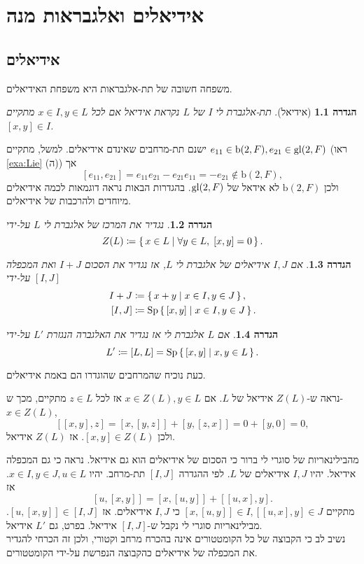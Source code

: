 \documentclass{report}
\theoremstyle{break}
\newtheorem{definition}[definition]{הגדרה}
\theoremstyle{MyNonumberbreak}
\DeclareMathOperator{\Sp}{Sp}
\begin{document}
\chapter{אידיאלים ואלגבראות מנה}
\section{אידיאלים}
משפחה חשובה של תת-אלגבראות היא משפחת האידיאלים. 
\begin{definition}[אידיאל]
	תת-אלגברת לי $I$ של $L$ נקראת \textit{אידיאל} אם לכל $x \in I, y \in L$ מתקיים $[x, y] \in I$.
\end{definition}
ישנם תת-מרחבים שאינדם אידיאלים. למשל, מתקיים $e_{11} \in \mathrm{b}(2, F), e_{21} \in \operatorname{gl}(2, F)$ (ראו \autoref*{exa:Lie} (ה)) אך
\[ [e_{11}, e_{21}] = e_{11}e_{21} - e_{21}e_{11} = -e_{21} \notin \mathrm{b}(2, F), \]
ולכן $\mathrm{b}(2, F)$ לא אידאל של $\operatorname{gl}(2, F)$. בהגדרות הבאות נראה דוגמאות לכמה אידיאלים מיוחדים ולהרכבות של אידיאלים.
\begin{definition} \label{def:centre}
	נגדיר את \textit{המרכז} של אלגברת לי $L$ על-ידי
	\[ Z(L) \coloneqq \set{x \in L | \forall y \in L, \; [x, y] = 0}. \]
\end{definition}
\begin{definition} \label{def:sum-prod-ideal}
	אם $I, J$ אידיאלים של אלגברת לי $L$, אז נגדיר את \textit{הסכום} $I + J$ ואת \textit{המכפלה} $[I, J]$ על-ידי
	\begin{align*}
		I + J &\coloneqq \set{x + y | x \in I, y \in J}, \\
		[I, J] &\coloneqq \Sp\set{[x, y] | x \in I , y \in J}.
	\end{align*}
\end{definition}
\begin{definition} \label{def:derived-ideal}
	אם $L$ אלגברת לי אז נגדיר את \textit{האלגברה הנגזרת} $L'$ על-ידי
	\[ L' \coloneqq [L, L] = \Sp\set{[x, y] | x, y \in L}. \]
\end{definition}
כעת נוכיח שהמרחבים שהוגדרו הם באמת אידיאלים.

נראה ש-$Z(L)$ אידיאל של $L$. אם $x \in Z(L), y \in L$ אז לכל $z \in L$ מתקיים, מכך ש-$x \in Z(L)$,
	\[ [[x, y], z] = [x, [y, z]] + [y, [z, x]] = 0 + [y, 0] = 0, \]
ולכן $[x, y] \in Z(L)$. אז $Z(L)$ אידיאל.
	
	מהבילינאריות של סוגרי לי ברור כי הסכום של אידיאלים הוא גם אידיאל. נראה כי גם המכפלה אידיאל. יהיו $I, J$ אידיאלים של $L$. לפי ההגדרה $[I, J]$ תת-מרחב. יהיו $x \in I, y \in J, u \in L$. אז
	\[ [u, [x, y]] = [x, [u, y]] + [[u, x], y]. \]
	מתקיים $[x, [u, y]] \in I, [[u, x], y] \in J$ כי $I, J$ אידיאלים. אז $[u, [x, y]] \in [I, J]$. מבילינאריות סוגרי לי נקבל ש-$[I, J]$ אידיאל. בפרט, גם $L'$ אידיאל. \\
	נשיב לב כי הקבוצה של כל הקומטטורים אינה בהכרח מרחב וקטורי, ולכן זה הכרחי להגדיר את המכפלה של אידיאלים כהקבוצה הנפרשת על-ידי הקומטטורים.
	
\end{document}
